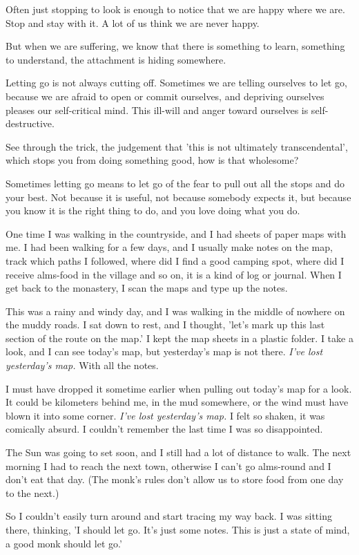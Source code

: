 Often just stopping to look is enough to notice that we are happy where
we are. Stop and stay with it. A lot of us think we are never happy.

But when we are suffering, we know that there is something to learn,
something to understand, the attachment is hiding somewhere.

Letting go is not always cutting off. Sometimes we are telling ourselves
to let go, because we are afraid to open or commit ourselves, and
depriving ourselves pleases our self-critical mind. This ill-will and
anger toward ourselves is self-destructive.

See through the trick, the judgement that 'this is not ultimately
transcendental', which stops you from doing something good, how is that
wholesome?

Sometimes letting go means to let go of the fear to pull out all the
stops and do your best. Not because it is useful, not because somebody
expects it, but because you know it is the right thing to do, and you
love doing what you do.

One time I was walking in the countryside, and I had sheets of paper
maps with me. I had been walking for a few days, and I usually make
notes on the map, track which paths I followed, where did I find a good
camping spot, where did I receive alms-food in the village and so on, it
is a kind of log or journal. When I get back to the monastery, I scan
the maps and type up the notes.

This was a rainy and windy day, and I was walking in the middle of
nowhere on the muddy roads. I sat down to rest, and I thought, 'let's
mark up this last section of the route on the map.' I kept the map
sheets in a plastic folder. I take a look, and I can see today's map,
but yesterday's map is not there. \emph{I've lost yesterday's map.} With
all the notes.

I must have dropped it sometime earlier when pulling out today's map for
a look. It could be kilometers behind me, in the mud somewhere, or the
wind must have blown it into some corner. \emph{I've lost yesterday's
map.} I felt so shaken, it was comically absurd. I couldn't remember the
last time I was so disappointed.

The Sun was going to set soon, and I still had a lot of distance to
walk. The next morning I had to reach the next town, otherwise I can't
go alms-round and I don't eat that day. (The monk's rules don't allow us
to store food from one day to the next.)

So I couldn't easily turn around and start tracing my way back. I was
sitting there, thinking, 'I should let go. It's just some notes. This is
just a state of mind, a good monk should let go.'

